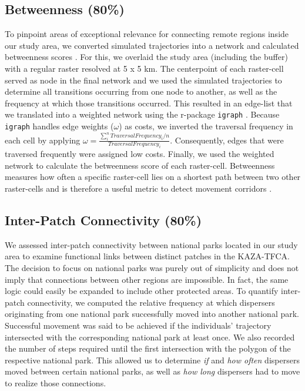 \documentclass[abstract=on,10pt,a4paper,bibliography=totocnumbered]{article}
\begin{document}
\subsection{Betweenness (80\%)}
To pinpoint areas of exceptional relevance for connecting remote regions inside
our study area, we converted simulated trajectories into a network and
calculated betweenness scores \citep{BastilleRousseau.2018}. For this, we
overlaid the study area (including the buffer) with a regular raster resolved at
5 x 5 km. The centerpoint of each raster-cell served as node in the final
network and we used the simulated trajectories to determine all transitions
occurring from one node to another, as well as the frequency at which those
transitions occurred. This resulted in an edge-list that we translated into a
weighted network using the r-package {\tt igraph} \citep{Gabor.2006}. Because
{\tt igraph} handles edge weights (\(\omega\)) as costs, we inverted the
traversal frequency in each cell by applying \(\omega = \frac{\sum_i^n{Traversal
Frequency_i}/n}{Traversal Frequency_i}\). Consequently, edges that were
traversed frequently were assigned low costs. Finally, we used the weighted
network to calculate the betweenness score of each raster-cell. Betweenness
measures how often a specific raster-cell lies on a shortest path between two
other raster-cells and is therefore a useful metric to detect movement corridors
\citep{BastilleRousseau.2018}.

\subsection{Inter-Patch Connectivity (80\%)}
We assessed inter-patch connectivity between national parks located in our study
area to examine functional links between distinct patches in the KAZA-TFCA. The
decision to focus on national parks was purely out of simplicity and does not
imply that connections between other regions are impossible. In fact, the same
logic could easily be expanded to include other protected areas. To quantify
inter-patch connectivity, we computed the relative frequency at which dispersers
originating from one national park successfully moved into another national
park. Successful movement was said to be achieved if the individuals' trajectory
intersected with the corresponding national park at least once. We also recorded
the number of steps required until the first intersection with the polygon of
the respective national park. This allowed us to determine \textit{if} and
\textit{how often} dispersers moved between certain national parks, as well as
\textit{how long} dispersers had to move to realize those connections.
\end{document}

